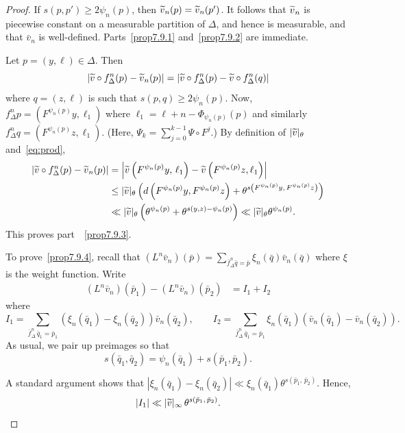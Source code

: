\documentclass[10pt]{amsart}
\theoremstyle{definition}\newtheorem{defi}[theo]{Definition}\newtheorem{rema}[theo]{Remark}\newtheorem{exam}[theo]{Example}\newtheorem{exem}[theo]{Example}\newtheorem{nota}[theo]{Notation}
\newcommand{\tv}{\tilde{v}}
\let\oldtilde\tilde
\renewcommand*{\tilde}[1]{\mathchoice{\widetilde{#1}}{\widetilde{#1}}{\oldtilde{#1}}{\oldtilde{#1}}}
\begin{document}
\begin{proof}
If $s(p,p')\ge 2\psi_n(p)$, then $\tv_n(p)=\tv_n(p')$. It follows that $\tv_n$ is piecewise constant on a measurable partition of $\Delta$, and hence is measurable, and that $\bar v_n$ is well-defined. Parts~\eqref{prop7.9.1} and~\eqref{prop7.9.2} are immediate.

Let $p=(y,\ell)\in\Delta$. Then
\[
\left|\tv\circ f_\Delta^n(p)-\tv_n(p)\right| =\left|\tv\circ f_\Delta^n(p)-\tv\circ f_\Delta^n(q)\right|
\]
where $q=(z,\ell)$ is such that $s(p,q)\ge 2\psi_n(p)$. Now, $f_\Delta^np=(F^{\psi_n(p)}y,\ell_1)$ where $\ell_1=\ell+n-\Phi_{\psi_n(p)}(p)$ and similarly $f_\Delta^nq=(F^{\psi_n(p)}z,\ell_1)$. (Here, $\Psi_k=\sum_{j=0}^{k-1}\Psi\circ F^j$.) By definition of $|\tv|_\theta$ and~\eqref{eq:prod},
\begin{align*}
\left|\tv\circ f_\Delta^n(p)-\tv_n(p)\right| & = \left|\tv\left(F^{\psi_n(p)}y,\,\ell_1\right) -\tv\left(F^{\psi_n(p)}z,\ell_1\right)\right|
\\ & \le |\tv|_\theta\left(d\left(F^{\psi_n(p)}y,F^{\psi_n(p)}z\right)+\theta^{s\left(F^{\psi_n(p)}y,\,F^{\psi_n(p)}z\right)}\right)
\\ & \ll |\tv|_\theta \left(\theta^{\psi_n(p)}+\theta^{s(y,z)-\psi_n(p)}\right)
\ll |\tv|_\theta \theta^{\psi_n(p)}.
\end{align*}
This proves part~~\eqref{prop7.9.3}.

To prove~\eqref{prop7.9.4}, recall that $(L^n\bar v_n)(\bar p)=\sum_{\bar f_\Delta^n\bar q=\bar p}\xi_n(\bar q)\bar v_n(\bar q)$ where $\xi$ is the weight function. Write
\begin{align*}
(L^n\bar v_n)(\bar p_1)- (L^n\bar v_n)(\bar p_2) & = I_1+I_2
\end{align*}
where
\[
I_1 = \sum_{\bar f_\Delta^n\,\bar q_1=\bar p_1}\left(\xi_n(\bar q_1)-\xi_n(\bar q_2)\right)\bar v_n(\bar q_2), \qquad I_2 = \sum_{\bar f_\Delta^n\,\bar q_1=\bar p_1}\xi_n(\bar q_1)\left(\bar v_n(\bar q_1)-\bar v_n(\bar q_2)\right).
\]
As usual, we pair up preimages so that
\begin{equation}\label{eq:pairs}
s(\bar q_1,\bar q_2)=\psi_n(\bar q_1)+s(\bar p_1,\bar p_2).
\end{equation}

A standard argument shows that $|\xi_n(\bar q_1)-\xi_n(\bar q_2)|\ll \xi_n(\bar q_1)\theta^{s(\bar p_1,\,\bar p_2)}$. Hence,
\[
|I_1|\ll |\tv|_\infty\, \theta^{s\left(\bar p_1,\,\bar p_2\right)}.
\]


\end{proof}
\end{document}
